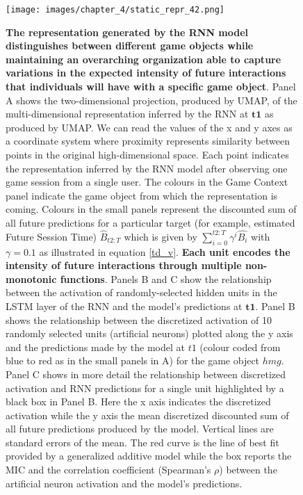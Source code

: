 \begin{figure}[ht]
\centering
\texttt{[image: images/chapter\_4/static\_repr\_42.png]}
\caption{\textbf{The representation generated by the RNN model distinguishes between different game objects while maintaining an overarching organization able to capture variations in the expected intensity of future interactions that individuals will have with a specific game object}. Panel A shows the two-dimensional projection, produced by UMAP, of the multi-dimensional representation inferred by the RNN at $\mathbf{t1}$ as produced by UMAP. We can read the values of the x and y axes as a coordinate system where proximity represents similarity between points in the original high-dimensional space. Each point indicates the representation inferred by the RNN model after observing one game session from a single user. The colours in the Game Context panel indicate the game object from which the representation is coming. Colours in the small panels represent the discounted sum of all future predictions for a particular target (for example, estimated Future Session Time) $\widehat{B}_{t2:T}$ which is given by $\sum_{i=0}^{t2:T} \gamma^i\widehat{B_i}$ with $\gamma=0.1$ as illustrated in equation \ref{td_v}. \textbf{Each unit  encodes the intensity of future interactions through multiple non-monotonic functions}. Panels B and C show the relationship between the activation of randomly-selected hidden units in the LSTM layer of the RNN and the model's predictions at $\mathbf{t1}$. Panel B shows the relationship between the discretized activation of 10 randomly selected units (artificial neurons) plotted along the y axis and the predictions made by the model at $t1$ (colour coded from blue to red as in the small panels in A) for the game object $hmg$. Panel C shows in more detail the relationship between discretized activation and RNN predictions for a single unit highlighted by a black box in Panel B. Here the x axis indicates the discretized activation while the y axis the mean discretized discounted sum of all future predictions produced by the model. Vertical lines are standard errors of the mean. The red curve is the line of best fit provided by a generalized additive model \cite{serven2018} while the box reports the MIC and the correlation coefficient (Spearman's $\rho$) between the artificial neuron activation and the model's predictions.}
\label{full_panel_static}
\end{figure}
